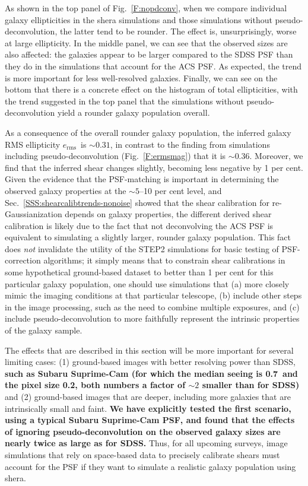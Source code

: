 \documentclass[twocolumn,useAMS,usenatbib]{mn2e}
\newcommand{\erms}{\ensuremath{e_\mathrm{rms}}}
\newcommand{\newtext}{}
\newcommand{\reftext}[1]{\textbf{#1}}
\begin{document}
As shown in the top panel of Fig.~\ref{F:nopdconv}, when we compare
individual galaxy ellipticities in the {\sc shera} simulations and those
simulations 
without pseudo-deconvolution, the latter tend to be rounder.  The
effect is, unsurprisingly, worse at large ellipticity.  In the
middle panel, we can see that the observed sizes are also affected:
the galaxies appear to be larger compared to the SDSS PSF than they do in
the simulations that account for the ACS PSF.  As expected, the trend
is more important for less well-resolved galaxies.  Finally, we can
see on the bottom that there is a concrete effect on the
histogram of total ellipticities, with the trend suggested in the top
panel that the simulations without pseudo-deconvolution yield a
rounder galaxy population overall.

As a consequence of the overall rounder galaxy population, the
inferred galaxy RMS ellipticity \erms\ is $\sim
0.31$, in contrast to the finding from simulations including
pseudo-deconvolution (Fig.~\ref{F:ermsmag}) that it is
$\sim 0.36$.  Moreover, we find that the inferred shear changes
slightly, becoming less negative by 1 per cent.  \newtext{Given the evidence that the
 PSF-matching is important in determining the observed galaxy
properties at the $\sim 5$--10 per cent level, and Sec.~\ref{SSS:shearcalibtrends-nonoise} showed
that the shear calibration for re-Gaussianization depends on galaxy
properties, the different derived shear calibration is likely due to
the fact that not deconvolving the ACS PSF is equivalent to
simulating a slightly larger, rounder galaxy population.  This fact
does {\em not} invalidate the utility of the STEP2 simulations for basic
testing of PSF-correction algorithms; it simply means that to
constrain shear calibrations in some hypothetical ground-based dataset
to better than 1 per cent for this particular galaxy population, one
should use simulations that (a) more closely mimic the imaging
conditions at that particular telescope, (b) include other steps in
the image processing, such as the need to combine multiple exposures,
and (c) include pseudo-deconvolution to more faithfully represent the
intrinsic properties of the galaxy sample.} 

The effects that are described in this section will be more important
for several limiting cases: (1) ground-based images with better
resolving power than SDSS, \reftext{such as Subaru Suprime-Cam (for which the
median seeing is 0.7\arcsec\ and the pixel size 0.2\arcsec, both
numbers a factor of $\sim 2$ smaller than for SDSS)} and (2) ground-based images that are
deeper, including more galaxies that are intrinsically small and
faint.  \reftext{We have explicitly tested the first scenario, using a typical
Subaru Suprime-Cam PSF, and found that the effects of ignoring
pseudo-deconvolution on the observed galaxy sizes are nearly twice as
large as for SDSS.}  Thus, for all upcoming surveys, image simulations that rely
on space-based data to precisely calibrate shears must
account for the PSF if they want to simulate a realistic galaxy
population using {\sc shera}. 
\end{document}
